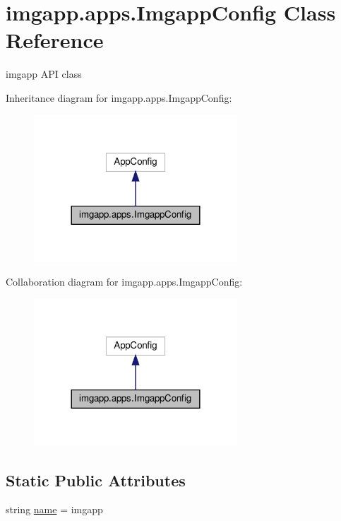 \hypertarget{classimgapp_1_1apps_1_1ImgappConfig}{}\section{imgapp.\+apps.\+Imgapp\+Config Class Reference}
\label{classimgapp_1_1apps_1_1ImgappConfig}


imgapp A\+PI class  




Inheritance diagram for imgapp.\+apps.\+Imgapp\+Config\+:
\nopagebreak
\begin{figure}[H]
\begin{center}
\leavevmode
\includegraphics[width=216pt]{classimgapp_1_1apps_1_1ImgappConfig__inherit__graph}
\end{center}
\end{figure}


Collaboration diagram for imgapp.\+apps.\+Imgapp\+Config\+:
\nopagebreak
\begin{figure}[H]
\begin{center}
\leavevmode
\includegraphics[width=216pt]{classimgapp_1_1apps_1_1ImgappConfig__coll__graph}
\end{center}
\end{figure}
\subsection*{Static Public Attributes}
\begin{DoxyCompactItemize}
\item 
string \hyperlink{classimgapp_1_1apps_1_1ImgappConfig_a3eafdf46b561d2f3764888b9e7cfe9e5}{name} = \textquotesingle{}imgapp\textquotesingle{}
\end{DoxyCompactItemize}


